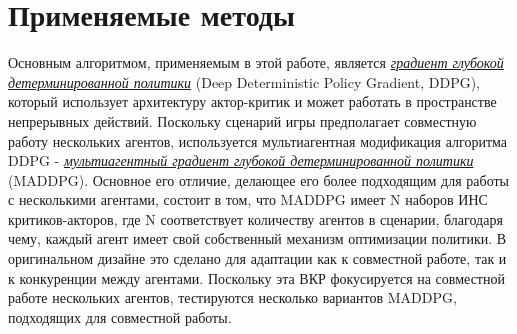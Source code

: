 \chapter{Применяемые методы} \label{ch3}

Основным алгоритмом, применяемым в этой работе, является \hyperref[acr:ddpg]{\textit{градиент глубокой детерминированной политики}} (Deep Deterministic Policy Gradient, DDPG), который использует архитектуру актор-критик и может работать в пространстве непрерывных действий. Поскольку сценарий игры предполагает совместную работу нескольких агентов, используется мультиагентная модификация алгоритма DDPG - \hyperref[acr:maddpg]{\textit{мультиагентный градиент глубокой детерминированной политики}} (MADDPG). Основное его отличие, делающее его более подходящим для работы с несколькими агентами, состоит в том, что MADDPG имеет N наборов ИНС критиков-акторов, где N соответствует количеству агентов в сценарии, благодаря чему, каждый агент имеет свой собственный механизм оптимизации политики. В оригинальном дизайне \cite{lowe2017multiagent} это сделано для адаптации как к совместной работе, так и к конкуренции между агентами.
Поскольку эта ВКР фокусируется на совместной работе нескольких агентов, тестируются несколько вариантов MADDPG, подходящих для совместной работы. %
